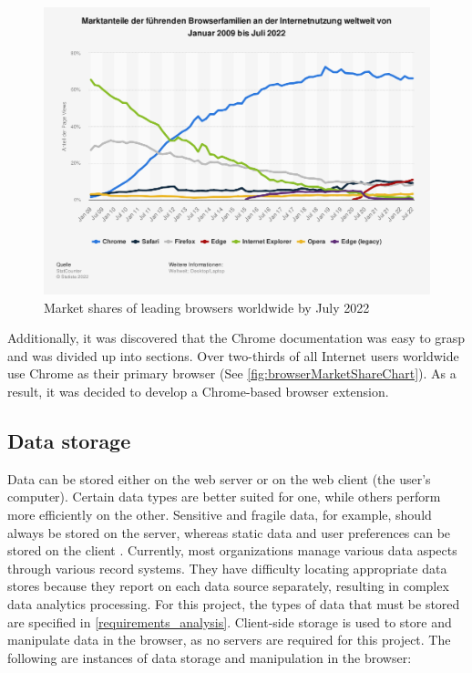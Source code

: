 \begin{figure}[H]
  \includegraphics[width=\textwidth]{assets/statistic_id157944_marktanteile-fuehrender-browser-weltweit-bis-juli-2022.png}
  \caption{Market shares of leading browsers worldwide by July 2022}
  \label{fig:browserMarketShareChart}
\end{figure}

Additionally, it was discovered that the Chrome documentation was easy to grasp and was divided up into sections. Over two-thirds of all Internet users worldwide use Chrome as their primary browser (See \autoref{fig:browserMarketShareChart}). As a result, it was decided to develop a Chrome-based browser extension.

\subsection{Data storage}
Data can be stored either on the web server or on the web client (the user's computer). Certain data types are better suited for one, while others perform more efficiently on the other. Sensitive and fragile data, for example, should always be stored on the server, whereas static data and user preferences can be stored on the client \autocite{macdonald2013html5}. Currently, most organizations manage various data aspects through various record systems. They have difficulty locating appropriate data stores because they report on each data source separately, resulting in complex data analytics processing. For this project, the types of data that must be stored are specified in \autoref{requirements_analysis}. Client-side storage is used to store and manipulate data in the browser, as no servers are required for this project. The following are instances of data storage and manipulation in the browser:

